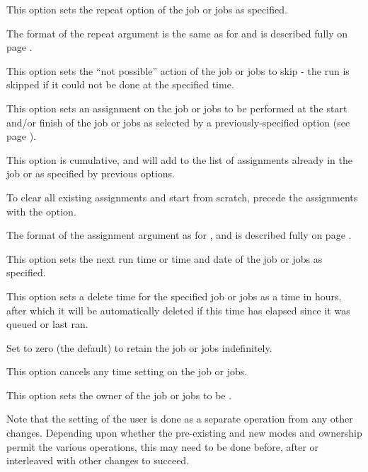 
This option sets the repeat option of the job or jobs as specified.

The format of the repeat argument is the same as for \PrBtr{} and is described fully on page \pageref{btr:repeatfmt}.


This option sets the ``not possible'' action of the job or jobs to skip - the run is skipped if it could not be done at the specified
time.


This option sets an assignment on the job or jobs to be performed at the start and/or finish of the job or jobs as selected by a
previously-specified  option (see page \pageref{btjchange:assflags}).

This option is cumulative, and will add to the list of assignments already in the job or as specified by previous  options.

To clear all existing assignments and start from scratch, precede the assignments with the  option.

The format of the assignment argument as for \PrBtr{}, and is described fully on page \pageref{btr:assfmt}.


This option sets the next run time or time and date of the job or jobs as specified.


This option sets a delete time for the specified job or jobs as a time in hours, after which it will be automatically deleted if this time has
elapsed since it was queued or last ran.

Set to zero (the default) to retain the job or jobs indefinitely.


This option cancels any time setting on the job or jobs.


This option sets the owner of the job or jobs to be .

Note that the setting of the user is done as a separate operation from any other changes. Depending upon whether the pre-existing and new
modes and ownership permit the various operations, this may need to be done before, after or interleaved with other changes to
succeed.

